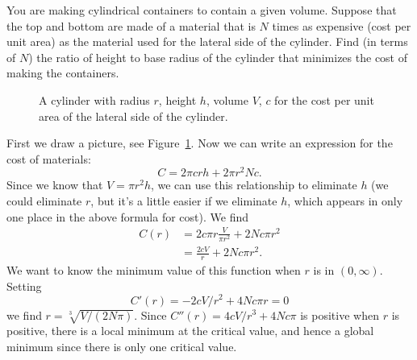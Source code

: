     
\begin{example}
    You are making cylindrical containers to contain a given volume.  Suppose
    that the top and bottom are made of a material that is $N$ times as
    expensive (cost per unit area) as the material used for the lateral side of
    the cylinder.  Find (in terms of $N$) the ratio of height to base radius of
    the cylinder that minimizes the cost of making the containers. \cite{mooc}
    
    \begin{figure}[H]
        \centering
    \caption{A cylinder with radius $r$, height $h$, volume $V$, $c$ for
      the cost per unit area of the lateral side of the cylinder.}
    \label{fig:cylinder}
    \end{figure}
    
    \begin{solution}
    First we draw a picture, see Figure~\ref{fig:cylinder}.  Now we can
    write an expression for the cost of materials:
    \[
      C = 2\pi crh+2\pi r^2Nc.
    \]
    Since we know that $V=\pi r^2h$, we can use this relationship to
    eliminate $h$ (we could eliminate $r$, but it's a little easier if we
    eliminate $h$, which appears in only one place in the above formula
    for cost).  We find
    \begin{align*}
    C(r)&=2c\pi r\frac{V}{\pi r^2}+2Nc\pi r^2\\
    &=\frac{2cV}{r}+2Nc\pi r^2.
    \end{align*}
    We want to know the minimum value of this function when $r$ is in
    $(0,\infty)$. Setting
    \[
    C'(r)=-2cV/r^2+4Nc\pi r =0
    \]
    we find $r=\sqrt[3]{V/(2N\pi)}$.  Since $C''(r)=4cV/r^3+4Nc\pi$ is
      positive when $r$ is positive, there is a local minimum at the
      critical value, and hence a global minimum since there is only one
      critical value.
    

\end{solution}
\end{example}
